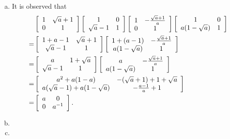 \documentclass{article}
\begin{document}
\begin{Answer}
\begin{enumerate}[(a)]
  \item{It is observed that
       \begin{align*}
         & \left[\begin{array}{c c}
           1               & \sqrt{a} + 1 \\
           0               & 1
         \end{array}\right]
         \left[\begin{array}{c c}
           1               & 0 \\
           \sqrt{a} - 1    & 1
         \end{array}\right]
         \left[\begin{array}{c c}
           1               & -\frac{\sqrt{a} + 1}{a} \\
           0               & 1
         \end{array}\right]
         \left[\begin{array}{c c}
           1               & 0 \\
           a(1 - \sqrt{a}) & 1
         \end{array}\right] \\
       = &
       \left[\begin{array}{c c}
         1 + a - 1    & \sqrt{a} + 1 \\
         \sqrt{a} - 1 & 1
       \end{array}\right]
       \left[\begin{array}{c c}
         1 + (a - 1)     & -\frac{\sqrt{a} + 1}{a} \\
         a(1 - \sqrt{a}) & 1
       \end{array}\right] \\
       = &
       \left[\begin{array}{c c}
           a            & 1 + \sqrt{a} \\
           \sqrt{a} - 1 & 1
       \end{array}\right]
       \left[\begin{array}{c c}
         a               & -\frac{\sqrt{a} + 1}{a} \\
         a(1 - \sqrt{a}) & 1
       \end{array}\right] \\
        =& 
        \left[\begin{array}{c c}
          a^2 + a(1 - a)                    & -(\sqrt{a} + 1) + 1 + \sqrt{a} \\
          a(\sqrt{a} - 1) + a(1 - \sqrt{a}) & -\frac{a - 1}{a} + 1
        \end{array}\right] \\
        =&
        \left[\begin{array}{c c}
          a & 0 \\ 0 & a^{-1}
        \end{array}\right].
       \end{align*}
      }
  \item{}
  \item{}
\end{enumerate}

\end{Answer}
\end{document}
